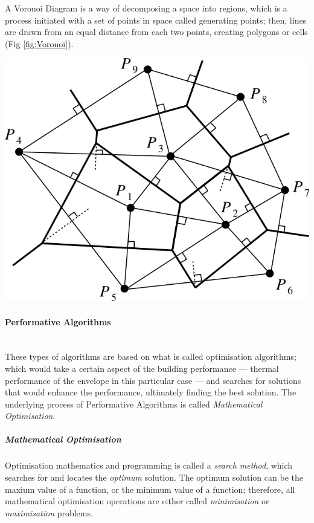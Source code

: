 \documentclass[11pt,a4paper,oneside]{article}
\newenvironment{Figure}		%
	{\par\medskip\noindent\minipage{\linewidth}}
	{\endminipage\par\medskip}
\begin{document}
\begin{multicols}{2}
A Voronoi Diagram is a way of decomposing a space into regions, which is a process initiated with a set of points in space called generating points; then, lines are drawn from an equal distance from each two points, creating polygons or cells (Fig \ref{fig:Voronoi}).

\begin{Figure}
	\includegraphics[width=\linewidth]{./Images/3-VoronoiDiagram}
	\label{fig:Voronoi}
\end{Figure}

\paragraph{Performative Algorithms}\mbox{}\\

These types of algorithms are based on what is called optimisation algorithms; which would take a certain aspect of the building performance --- thermal performance of the envelope in this particular case --- and searches for solutions that would enhance the performance, ultimately finding the best solution. The underlying process of Performative Algorithms is called \emph{Mathematical Optimisation}.

\subparagraph{Mathematical Optimisation}

Optimisation mathematics and programming is called a \emph{search method}, which searches for and locates the \emph{optimum} solution. The optimum solution can be the maxium value of a function, or the minimum value of a function; therefore, all mathematical optimisation operations are either called \emph{minimisation} or \emph{maximisation} problems.


\end{multicols}
\end{document}
